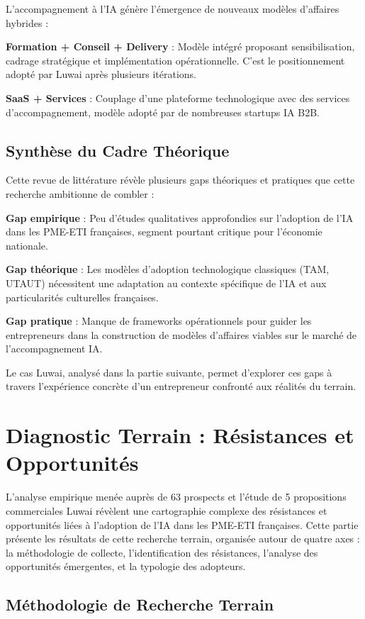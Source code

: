 \documentclass[12pt,a4paper]{report}
\begin{document}
L'accompagnement à l'IA génère l'émergence de nouveaux modèles d'affaires hybrides :

\textbf{Formation + Conseil + Delivery} : Modèle intégré proposant sensibilisation, cadrage stratégique et implémentation opérationnelle. C'est le positionnement adopté par Luwai après plusieurs itérations.

\textbf{SaaS + Services} : Couplage d'une plateforme technologique avec des services d'accompagnement, modèle adopté par de nombreuses startups IA B2B.

\section{Synthèse du Cadre Théorique}

Cette revue de littérature révèle plusieurs gaps théoriques et pratiques que cette recherche ambitionne de combler :

\textbf{Gap empirique} : Peu d'études qualitatives approfondies sur l'adoption de l'IA dans les PME-ETI françaises, segment pourtant critique pour l'économie nationale.

\textbf{Gap théorique} : Les modèles d'adoption technologique classiques (TAM, UTAUT) nécessitent une adaptation au contexte spécifique de l'IA et aux particularités culturelles françaises.

\textbf{Gap pratique} : Manque de frameworks opérationnels pour guider les entrepreneurs dans la construction de modèles d'affaires viables sur le marché de l'accompagnement IA.

Le cas Luwai, analysé dans la partie suivante, permet d'explorer ces gaps à travers l'expérience concrète d'un entrepreneur confronté aux réalités du terrain.

\chapter{Diagnostic Terrain : Résistances et Opportunités}

L'analyse empirique menée auprès de 63 prospects et l'étude de 5 propositions commerciales Luwai révèlent une cartographie complexe des résistances et opportunités liées à l'adoption de l'IA dans les PME-ETI françaises. Cette partie présente les résultats de cette recherche terrain, organisée autour de quatre axes : la méthodologie de collecte, l'identification des résistances, l'analyse des opportunités émergentes, et la typologie des adopteurs.

\section{Méthodologie de Recherche Terrain}
\end{document}
